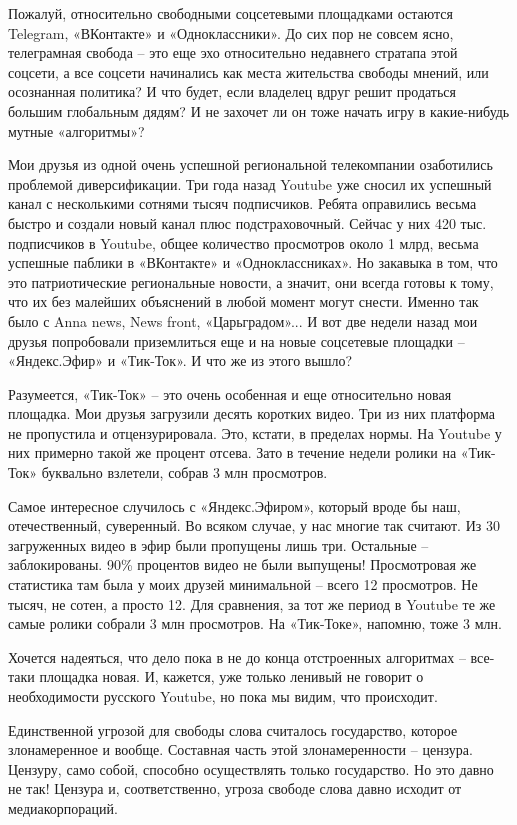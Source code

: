 Пожалуй, относительно свободными соцсетевыми площадками остаются Telegram,
«ВКонтакте» и «Одноклассники». До сих пор не совсем ясно, телеграмная свобода –
это еще эхо относительно недавнего стратапа этой соцсети, а все соцсети
начинались как места жительства свободы мнений, или осознанная политика? И что
будет, если владелец вдруг решит продаться большим глобальным дядям? И не
захочет ли он тоже начать игру в какие-нибудь мутные «алгоритмы»?

Мои друзья из одной очень успешной региональной телекомпании озаботились
проблемой диверсификации. Три года назад Youtube уже сносил их успешный канал с
несколькими сотнями тысяч подписчиков. Ребята оправились весьма быстро и
создали новый канал плюс подстраховочный. Сейчас у них 420 тыс. подписчиков в
Youtube, общее количество просмотров около 1 млрд, весьма успешные паблики в
«ВКонтакте» и «Одноклассниках». Но закавыка в том, что это патриотические
региональные новости, а значит, они всегда готовы к тому, что их без малейших
объяснений в любой момент могут снести. Именно так было с Anna news, News
front, «Царьградом»... И вот две недели назад мои друзья попробовали
приземлиться еще и на новые соцсетевые площадки – «Яндекс.Эфир» и «Тик-Ток». И
что же из этого вышло? 

Разумеется, «Тик-Ток» – это очень особенная и еще относительно новая площадка.
Мои друзья загрузили десять коротких видео. Три из них платформа не пропустила
и отцензурировала. Это, кстати, в пределах нормы. На Youtube у них примерно
такой же процент отсева. Зато в течение недели ролики на «Тик-Ток» буквально
взлетели, собрав 3 млн просмотров.

Самое интересное случилось с «Яндекс.Эфиром», который вроде бы наш,
отечественный, суверенный. Во всяком случае, у нас многие так считают. Из 30
загруженных видео в эфир были пропущены лишь три. Остальные – заблокированы.
90\% процентов видео не были выпущены! Просмотровая же статистика там была у
моих друзей минимальной – всего 12 просмотров. Не тысяч, не сотен, а просто 12.
Для сравнения, за тот же период в Youtube те же самые ролики собрали 3 млн
просмотров. На «Тик-Токе», напомню, тоже 3 млн.

Хочется надеяться, что дело пока в не до конца отстроенных алгоритмах –
все-таки площадка новая. И, кажется, уже только ленивый не говорит о
необходимости русского Youtube, но пока мы видим, что происходит.

Единственной угрозой для свободы слова считалось государство, которое
злонамеренное и вообще. Составная часть этой злонамеренности – цензура.
Цензуру, само собой, способно осуществлять только государство. Но это давно не
так! Цензура и, соответственно, угроза свободе слова давно исходит от
медиакорпораций.


